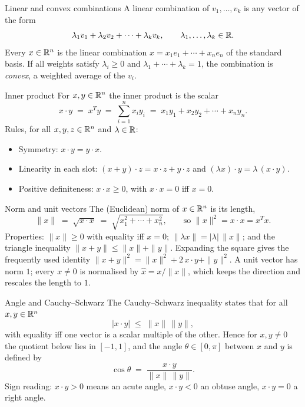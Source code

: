 \begin{rulebox}{Linear and convex combinations}
A linear combination of $v_{1}, \dots, v_{k}$ is
any vector of the form
\[
\lambda_{1} v_{1} + \lambda_{2} v_{2} + \cdots + \lambda_{k} v_{k},
\qquad \lambda_{1}, \dots, \lambda_{k} \in \mathbb{R}.
\]
Every $x \in \mathbb{R}^{n}$ is the linear combination
$x = x_{1} e_{1} + \cdots + x_{n} e_{n}$ of the standard basis. If all
weights satisfy $\lambda_{i} \ge 0$ and $\lambda_{1} + \cdots + \lambda_{k}
= 1$, the combination is \emph{convex}, a
weighted average of the $v_{i}$.
\end{rulebox}

\begin{rulebox}{Inner product}
For $x, y \in \mathbb{R}^{n}$ the inner product is the scalar
\[
x \cdot y \;=\; x^{T} y \;=\; \sum_{i=1}^{n} x_{i} y_{i}
\;=\; x_{1} y_{1} + x_{2} y_{2} + \cdots + x_{n} y_{n}.
\]
Rules, for all $x, y, z \in \mathbb{R}^{n}$ and $\lambda \in \mathbb{R}$:
\begin{itemize}[leftmargin=1.6em,itemsep=0.3ex]
  \item Symmetry: $x \cdot y = y \cdot x$.
  \item Linearity in each slot: $(x + y) \cdot z = x \cdot z + y \cdot z$
        and $(\lambda x) \cdot y = \lambda \, (x \cdot y)$.
  \item Positive definiteness: $x \cdot x \ge 0$, with $x \cdot x = 0$ iff
        $x = 0$.
\end{itemize}
\end{rulebox}

\begin{rulebox}{Norm and unit vectors}
The (Euclidean) norm of $x \in \mathbb{R}^{n}$ is its length,
\[
\|x\| \;=\; \sqrt{x \cdot x} \;=\; \sqrt{x_{1}^{2} + \cdots + x_{n}^{2}},
\qquad \text{so } \|x\|^{2} = x \cdot x = x^{T} x .
\]
Properties: $\|x\| \ge 0$ with equality iff $x = 0$;
$\|\lambda x\| = |\lambda| \, \|x\|$; and the triangle inequality $\|x + y\| \le \|x\| + \|y\|$. Expanding the
square gives the frequently used identity
$\|x + y\|^{2} = \|x\|^{2} + 2\, x \cdot y + \|y\|^{2}$.
A unit vector has norm $1$; every $x \neq 0$ is
normalised by $\hat{x} = x / \|x\|$, which keeps the direction and rescales
the length to $1$.
\end{rulebox}

\begin{rulebox}{Angle and Cauchy--Schwarz}
The Cauchy--Schwarz inequality
states that for all $x, y \in \mathbb{R}^{n}$
\[
|x \cdot y| \;\le\; \|x\| \, \|y\|,
\]
with equality iff one vector is a scalar multiple of the other. Hence for
$x, y \neq 0$ the quotient below lies in $[-1, 1]$, and the angle $\theta \in [0, \pi]$ between $x$ and $y$ is defined by
\[
\cos \theta \;=\; \frac{x \cdot y}{\|x\| \, \|y\|}.
\]
Sign reading: $x \cdot y > 0$ means an acute angle, $x \cdot y < 0$ an
obtuse angle, $x \cdot y = 0$ a right angle.
\end{rulebox}

